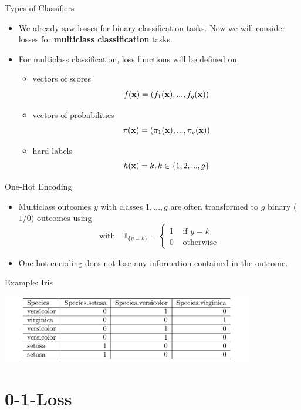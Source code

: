 \documentclass[11pt,compress,t,notes=noshow, xcolor=table]{beamer}
\begin{document}
\begin{vbframe}{Types of Classifiers}
\begin{itemize}
  \item We already saw losses for binary classification tasks. 
  Now we will consider losses for \textbf{multiclass classification} tasks.
  \lz
  \item For multiclass classification, loss functions will be defined on
  \begin{itemize}
    \item vectors of scores $$f(\mathbf{x}) = \left(f_1(\mathbf{x}), ..., f_g(\mathbf{x})\right)$$
    \item vectors of probabilities $$\pi(\mathbf{x}) = \left(\pi_1(\mathbf{x}), ..., \pi_g(\mathbf{x})\right)$$
    \item hard labels $$h(\mathbf{x}) = k, k \in \{1, 2, ..., g\}$$
\end{itemize}
\end{itemize}
\end{vbframe}

\begin{vbframe}{One-Hot Encoding}
\begin{itemize}
\item Multiclass outcomes $y$ with classes $1,\dots, g$ are often transformed to $g$ binary ($1$/$0$) outcomes 
using 
$$
\text{with}\quad \mathds{1}_{\{y = k\}} = \begin{cases} 1 & \text{ if } y = k \\
0 & \text{ otherwise}\end{cases}
$$
\item One-hot encoding does not lose any information contained in the outcome. 
\end{itemize}
\vspace{0.2cm}
Example: Iris

\vspace*{0.1cm}
\begin{center}
\includegraphics[width = 11cm ]{figure/iris_encoding.png}
\end{center}

\end{vbframe}

\section{0-1-Loss}
\end{document}
